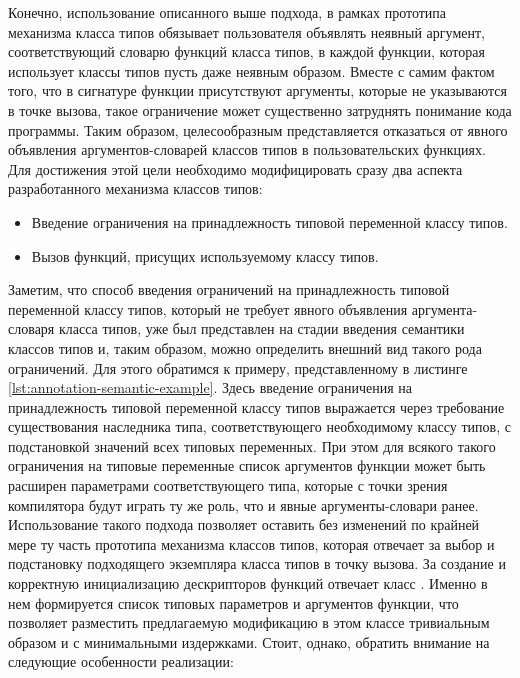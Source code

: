 
Конечно, использование описанного выше подхода, в рамках прототипа механизма класса типов обязывает пользователя объявлять неявный аргумент, соответствующий словарю функций класса типов, в каждой функции, которая использует классы типов пусть даже неявным образом. Вместе с самим фактом того, что в сигнатуре функции присутствуют аргументы, которые не указываются в точке вызова, такое ограничение может существенно затруднять понимание кода программы. Таким образом, целесообразным представляется отказаться от явного объявления аргументов-словарей классов типов в пользовательских функциях. Для достижения этой цели необходимо модифицировать сразу два аспекта разработанного механизма классов типов:
\begin{itemize}
    \item Введение ограничения на принадлежность типовой переменной классу типов. 
    \item Вызов функций, присущих используемому классу типов. 
\end{itemize}
Заметим, что способ введения ограничений на принадлежность типовой переменной классу типов, который не требует явного объявления аргумента-словаря класса типов, уже был представлен на стадии введения семантики классов типов и, таким образом, можно определить внешний вид такого рода ограничений. Для этого обратимся к примеру, представленному в листинге \ref{lst:annotation-semantic-example}. Здесь введение ограничения на принадлежность типовой переменной классу типов выражается через требование существования наследника типа, соответствующего необходимому классу типов, с подстановкой значений всех типовых переменных. При этом для всякого такого ограничения на типовые переменные список аргументов функции может быть расширен параметрами соответствующего типа, которые с точки зрения компилятора будут играть ту же роль, что и явные аргументы-словари ранее. Использование такого подхода позволяет оставить без изменений по крайней мере ту часть прототипа механизма классов типов, которая отвечает за выбор и подстановку подходящего экземпляра класса типов в точку вызова. За создание и корректную инициализацию дескрипторов функций отвечает класс . Именно в нем формируется список типовых параметров и аргументов функции, что позволяет разместить предлагаемую модификацию в этом классе тривиальным образом и с минимальными издержками. Стоит, однако, обратить внимание на следующие особенности реализации:
